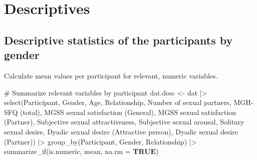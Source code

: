 \documentclass[
  bookmarksnumbered]{article}
\newenvironment{Shaded}{\begin{snugshade}}{\end{snugshade}}
\newcommand{\AttributeTok}[1]{\textcolor[rgb]{0.80,0.80,0.80}{#1}}
\newcommand{\CommentTok}[1]{\textcolor[rgb]{0.50,0.62,0.50}{#1}}
\newcommand{\ConstantTok}[1]{\textcolor[rgb]{0.86,0.64,0.64}{\textbf{#1}}}
\newcommand{\FunctionTok}[1]{\textcolor[rgb]{0.94,0.94,0.56}{#1}}
\newcommand{\NormalTok}[1]{\textcolor[rgb]{0.80,0.80,0.80}{#1}}
\newcommand{\OtherTok}[1]{\textcolor[rgb]{0.94,0.94,0.56}{#1}}
\newcommand{\SpecialCharTok}[1]{\textcolor[rgb]{0.86,0.64,0.64}{#1}}
\newcommand{\StringTok}[1]{\textcolor[rgb]{0.80,0.58,0.58}{#1}}
\begin{document}
\newpage

\hypertarget{descriptives}{%
\section{Descriptives}\label{descriptives}}

\hypertarget{descriptive-statistics-of-the-participants-by-gender}{%
\subsection{Descriptive statistics of the participants by gender}\label{descriptive-statistics-of-the-participants-by-gender}}

Calculate mean values per participant for relevant, numeric variables.

\begin{Shaded}
\begin{Highlighting}[]
\CommentTok{\# Summarize relevant variables by participant}
\NormalTok{dat.desc }\OtherTok{\textless{}{-}}\NormalTok{ dat }\SpecialCharTok{|\textgreater{}}
  \FunctionTok{select}\NormalTok{(Participant, Gender, Age, Relationship,}
         \StringTok{\textasciigrave{}}\AttributeTok{Number of sexual partners}\StringTok{\textasciigrave{}}\NormalTok{, }\StringTok{\textasciigrave{}}\AttributeTok{MGH{-}SFQ (total)}\StringTok{\textasciigrave{}}\NormalTok{, }
         \StringTok{\textasciigrave{}}\AttributeTok{MGSS sexual satisfaction (General)}\StringTok{\textasciigrave{}}\NormalTok{, }\StringTok{\textasciigrave{}}\AttributeTok{MGSS sexual satisfaction (Partner)}\StringTok{\textasciigrave{}}\NormalTok{, }
         \StringTok{\textasciigrave{}}\AttributeTok{Subjective sexual attractiveness}\StringTok{\textasciigrave{}}\NormalTok{, }\StringTok{\textasciigrave{}}\AttributeTok{Subjective sexual arousal}\StringTok{\textasciigrave{}}\NormalTok{,}
         \StringTok{\textasciigrave{}}\AttributeTok{Solitary sexual desire}\StringTok{\textasciigrave{}}\NormalTok{, }\StringTok{\textasciigrave{}}\AttributeTok{Dyadic sexual desire (Attractive person)}\StringTok{\textasciigrave{}}\NormalTok{, }
         \StringTok{\textasciigrave{}}\AttributeTok{Dyadic sexual desire (Partner)}\StringTok{\textasciigrave{}}\NormalTok{) }\SpecialCharTok{|\textgreater{}}
  \FunctionTok{group\_by}\NormalTok{(Participant, Gender, Relationship) }\SpecialCharTok{|\textgreater{}}
  \FunctionTok{summarize\_if}\NormalTok{(is.numeric, mean, }\AttributeTok{na.rm =} \ConstantTok{TRUE}\NormalTok{)}
\end{Highlighting}
\end{Shaded}
\end{document}
